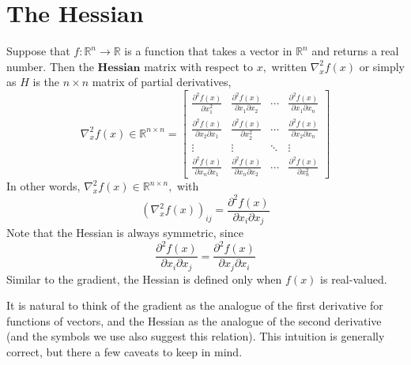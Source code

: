 \documentclass[10pt,a4paper,oneside]{article}
\begin{document}
\section{The Hessian}
Suppose that \(f : \mathbb{R}^{n} \rightarrow \mathbb{R}\) is a function that takes a vector in \(\mathbb{R}^{n}\) and returns a real number.
Then the $\bm{Hessian}$ matrix with respect to \(x,\) written \(\nabla_{x}^{2} f(x)\) or simply as \(H\) is the \(n \times n\) matrix of partial derivatives,
\[
\nabla_{x}^{2} f(x) \in \mathbb{R}^{n \times n}=\left[\begin{array}{cccc}{\frac{\partial^{2} f(x)}{\partial x_{1}^{2}}} & {\frac{\partial^{2} f(x)}{\partial x_{1} \partial x_{2}}} & {\cdots} & {\frac{\partial^{2} f(x)}{\partial x_{1} \partial x_{n}}} \\ {\frac{\partial^{2} f(x)}{\partial x_{2} \partial x_{1}}} & {\frac{\partial^{2} f(x)}{\partial x_{2}^{2}}} & {\cdots} & {\frac{\partial^{2} f(x)}{\partial x_{2} \partial x_{n}}} \\ {\vdots} & {\vdots} & {\ddots} & {\vdots} \\ {\frac{\partial^{2} f(x)}{\partial x_{n} \partial x_{1}}} & {\frac{\partial^{2} f(x)}{\partial x_{n} \partial x_{2}}} & {\cdots} & {\frac{\partial^{2} f(x)}{\partial x_{n}^{2}}}\end{array}\right]
\]
In other words, \(\nabla_{x}^{2} f(x) \in \mathbb{R}^{n \times n},\) with
\[
\left(\nabla_{x}^{2} f(x)\right)_{i j}=\frac{\partial^{2} f(x)}{\partial x_{i} \partial x_{j}}
\]
Note that the Hessian is always symmetric, since
\[
\frac{\partial^{2} f(x)}{\partial x_{i} \partial x_{j}}=\frac{\partial^{2} f(x)}{\partial x_{j} \partial x_{i}}
\]
Similar to the gradient, the Hessian is defined only when \(f(x)\) is real-valued.

It is natural to think of the gradient as the analogue of the first derivative for functions of vectors, and the Hessian as the analogue of the second derivative (and the symbols we use also suggest this relation). This intuition is generally correct, but there a few caveats to keep in mind.
\end{document}
